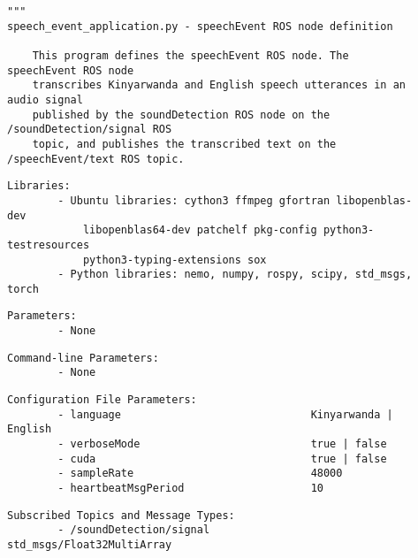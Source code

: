 \documentclass{CSSRforAfrica}
\newcommand{\checkboxChecked}{\fbox{\ding{51}}} %
\begin{document}
\begin{description}

\item[\checkboxChecked] 
 {\small 
\begin{verbatim}
"""
speech_event_application.py - speechEvent ROS node definition

    This program defines the speechEvent ROS node. The speechEvent ROS node
    transcribes Kinyarwanda and English speech utterances in an audio signal
    published by the soundDetection ROS node on the /soundDetection/signal ROS
    topic, and publishes the transcribed text on the /speechEvent/text ROS topic.
\end{verbatim}}

\item[\checkboxChecked] 
 {\small 
\begin{verbatim}
Libraries:
        - Ubuntu libraries: cython3 ffmpeg gfortran libopenblas-dev
            libopenblas64-dev patchelf pkg-config python3-testresources
            python3-typing-extensions sox
        - Python libraries: nemo, numpy, rospy, scipy, std_msgs, torch
\end{verbatim}}

\item[\checkboxChecked] 
 {\small 
\begin{verbatim}
Parameters:
        - None
\end{verbatim}}

\item[\checkboxChecked] 
 {\small 
\begin{verbatim}
Command-line Parameters:
        - None
\end{verbatim}}

\item[\checkboxChecked] 
 {\small 
\begin{verbatim}
Configuration File Parameters:
        - language                              Kinyarwanda | English
        - verboseMode                           true | false
        - cuda                                  true | false
        - sampleRate                            48000
        - heartbeatMsgPeriod                    10
\end{verbatim}}

\item[\checkboxChecked] 
 {\small 
\begin{verbatim}
Subscribed Topics and Message Types:
        - /soundDetection/signal                std_msgs/Float32MultiArray
\end{verbatim}}


\end{description}
\end{document}
